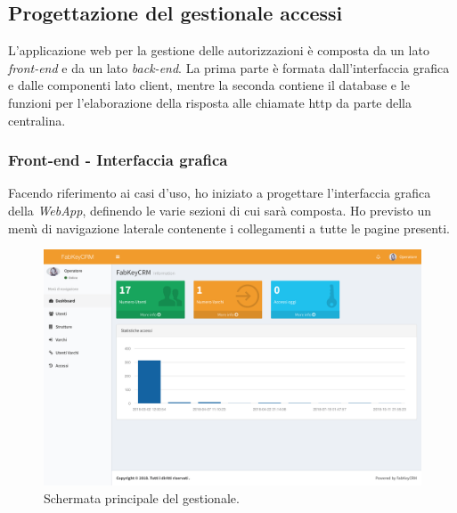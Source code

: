 
\subsection{Progettazione del gestionale accessi}
L'applicazione web per la gestione delle autorizzazioni è composta da un lato \textit{front-end} e da un lato \textit{back-end}. La prima parte è formata dall'interfaccia grafica e dalle componenti lato client, mentre la seconda contiene il database e le funzioni per l'elaborazione della risposta alle chiamate http da parte della centralina.

\subsubsection{Front-end - Interfaccia grafica}
Facendo riferimento ai casi d'uso, ho iniziato a progettare l'interfaccia grafica della \textit{WebApp}, definendo le varie sezioni di cui sarà composta.
Ho previsto un menù di navigazione laterale contenente i collegamenti a tutte le pagine presenti.

\begin{figure}[H]
	\begin{center}
	\includegraphics[scale=0.32]{immagini/dashboard_crm.png}
	\caption{Schermata principale del gestionale.}
	\end{center}
\end{figure}

